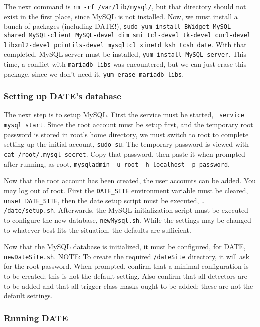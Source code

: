 \documentclass[12pt]{article}
\begin{document}
\qq The next command is {\tt rm -rf /var/lib/mysql/}, but that directory should
not exist in the first place, since MySQL is not installed. Now, we must install
a bunch of packages (including DATE!), {\tt sudo yum install BWidget
  MySQL-shared MySQL-client MySQL-devel dim smi tcl-devel tk-devel curl-devel
  libxml2-devel pciutils-devel mysqltcl xinetd ksh tcsh date}. With that
completed, MySQL server must be installed, {\tt yum install
  MySQL-server}. This time, a conflict with {\tt mariadb-libs} was encountered,
but we can just erase this package, since we don't need it, {\tt yum erase
  mariadb-libs}. 

\subsubsection{Setting up DATE's database}

\qq The next step is to setup MySQL. First the service must be started, {\tt
  service mysql start}. Since the root account must be setup first, and the
temporary root password is stored in root's home directory, we must switch to
root to complete setting up the initial account, {\tt sudo su}. The temporary
password is viewed with {\tt cat /root/.mysql\_secret}. Copy that password, then
paste it when prompted after running, as root, {\tt mysqladmin -u root -h
  localhost -p password}. 

\qq Now that the root account has been created, the user accounts can be
added. You may log out of root. First the {\tt DATE\_SITE} environment variable
must be cleared, {\tt unset DATE\_SITE}, then the date setup script must be
executed, {\tt . /date/setup.sh}. Afterwards, the MySQL initialization script
must be executed to configure the new database, {\tt newMysql.sh}. While the
settings may be changed to whatever best fits the situation, the defaults are
sufficient.

\qq Now that the MySQL database is initialized, it must be configured, for DATE,
{\tt newDateSite.sh}. NOTE: To create the required {\tt /dateSite} directory, it
will ask for the root password. When prompted, confirm that a minimal
configuration is to be created; this is not the default setting. Also confirm
that all detectors are to be added and that all trigger class masks ought to be
added; these are not the default settings.

\subsubsection{Running DATE}
\end{document}
